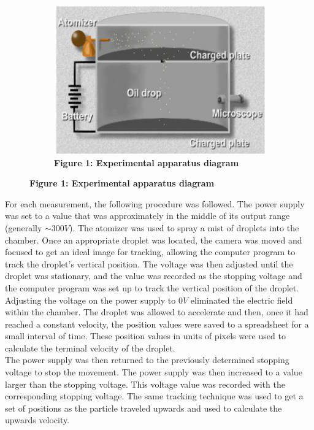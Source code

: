 \documentclass[
	letterpaper, %
	10pt, %
]{CSUniSchoolLabReport}
\begin{document}
\begin{figure}[H]
	\centering
	\begin{subfigure}{0.45\textwidth}
		\includegraphics[width=\textwidth]{../figures/apparatusDiagram.png}
		\caption{\textbf{Figure 1: Experimental apparatus diagram}}
	\end{subfigure}
\end{figure}
For each measurement, the following procedure was followed. The power supply was set to a value that was approximately
in the middle of its output range (generally $\sim 300V$). The atomizer was used to spray a mist of droplets into
the chamber.
Once an appropriate droplet was located, the camera was moved and focused to get an ideal image for tracking, allowing
the computer program to track the droplet's vertical position. The voltage was then adjusted until the droplet was stationary,
and the value was recorded as the stopping voltage and the computer program was set up to track the vertical position of the
droplet.\\

Adjusting the voltage on the power supply to $0V$ eliminated the electric field within the chamber.
The droplet was allowed to accelerate and then, once it had reached a constant velocity, the position
values were saved to a spreadsheet for a small interval of time. These position values in units of pixels
were used to calculate
the terminal velocity of the droplet.\\

The power supply was then returned to the previously determined stopping voltage to
stop the movement. The power supply was then increased to a value larger than the stopping voltage. This voltage
value was recorded with the corresponding stopping voltage. The same tracking technique was used to get
a set of positions as the particle traveled upwards and used to calculate the upwards velocity.\\
\end{document}
